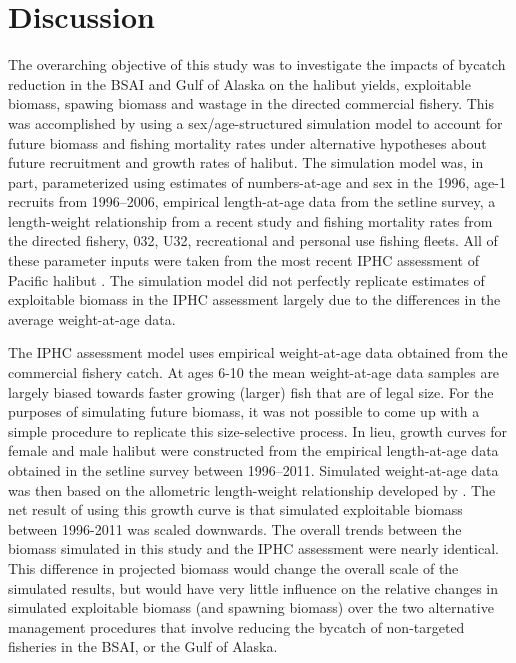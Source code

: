 
\section{Discussion} %
\label{sec:discussion}

The overarching objective of this study was to investigate the impacts of bycatch reduction in the BSAI and Gulf of Alaska on the halibut yields, exploitable biomass, spawing biomass and wastage in the directed commercial fishery.  This was accomplished by using a sex/age-structured simulation model to account for future biomass and fishing mortality rates under alternative hypotheses about future recruitment and growth rates of halibut.  The simulation model was, in part, parameterized using estimates of numbers-at-age and sex in the 1996, age-1 recruits from 1996--2006, empirical length-at-age data from the setline survey, a length-weight relationship from a recent study and fishing mortality rates from the directed fishery, 032, U32, recreational and personal use fishing fleets.  All of these parameter inputs were taken from the most recent IPHC assessment of Pacific halibut \citep[see][wobblesq model]{Hare2012Rara}.  The simulation model did not perfectly replicate estimates of exploitable biomass in the IPHC assessment largely due to the differences in the average weight-at-age data.  


The IPHC assessment model uses empirical weight-at-age data obtained from the commercial fishery catch.  At ages 6-10 the mean weight-at-age data samples are largely biased towards faster growing (larger) fish that are of legal size.  For the purposes of simulating future biomass, it was not possible to come up with a simple procedure to replicate this size-selective process.  In lieu, growth curves for female and male halibut were constructed from the empirical length-at-age data obtained in the setline survey between 1996--2011.  Simulated weight-at-age data was then based on the allometric length-weight relationship developed by \cite{courcellesre}.  The net result of using this growth curve is that simulated exploitable biomass between 1996-2011 was scaled downwards.  The overall trends between the biomass simulated in this study and the IPHC assessment were nearly identical.  This difference in projected biomass would change the overall scale of the simulated results, but would have very little influence on the relative changes in simulated exploitable biomass (and spawning biomass) over the two alternative management procedures that involve reducing the bycatch of non-targeted fisheries in the BSAI, or the Gulf of Alaska.



